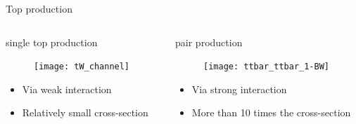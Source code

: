 \begin{frame}{Top production}
    \begin{columns}
        \begin{column}{0.5\textwidth}
            \vspace{-0.4cm}
        \begin{block}{\tW single top production}
        \end{block}
			\begin{figure}
	            \centering
	            \texttt{[image: tW\_channel]}
	        \end{figure}
	        \begin{itemize}
	        \item Via weak interaction
	        \item Relatively small cross-section
	        \end{itemize}
        \end{column}
        \begin{column}{0.5\textwidth}
        \begin{block}{\ttbar pair production}
        \end{block}
        \begin{figure}
            \centering
            \texttt{[image: ttbar\_ttbar\_1-BW]}
        \end{figure}
        \begin{itemize}
        	\item Via strong interaction
        	\item More than 10 times the cross-section
        \end{itemize}
        \end{column}
    \end{columns}
\end{frame}

